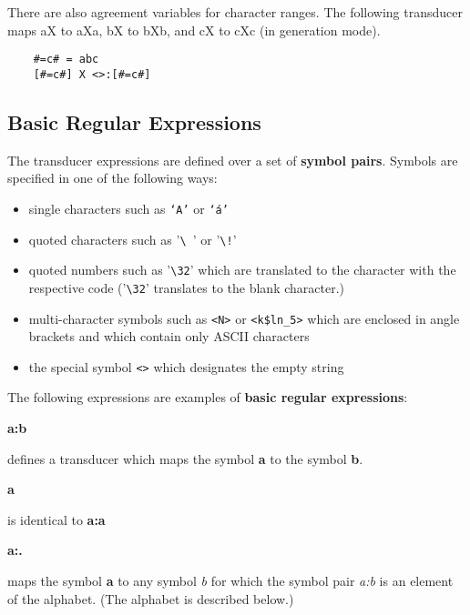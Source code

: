 \documentclass{article}
\begin{document}
There are also agreement variables for character ranges. The following
transducer maps aX to aXa, bX to bXb, and cX to cXc (in generation mode).
\begin{verbatim}
    #=c# = abc
    [#=c#] X <>:[#=c#]
\end{verbatim}


\subsection*{Basic Regular Expressions}

The transducer expressions are defined over a set of \textbf{symbol
  pairs}. Symbols are specified in one of the following ways:

\begin{itemize}
\item single characters such as \texttt{`A'} or \texttt{`{\'a}'}
\item quoted characters such as '\verb#\ #' or '\verb#\!#'
\item quoted numbers such as '\verb#\32#' which are translated to the character
  with the respective code ('\verb#\32#' translates to the blank
  character.)
\item multi-character symbols such as \verb#<N># or \verb#<k$ln_5># which
  are enclosed in angle brackets and which contain only ASCII characters
\item the special symbol \verb#<># which designates the empty string
\end{itemize}

\noindent
The following expressions are examples of \textbf{basic regular
  expressions}:\\

\parbox[t]{2cm}{\textbf{a:b}}
\begin{minipage}[t]{11cm}
  defines a transducer which maps the symbol \textbf{a} to the
  symbol \textbf{b}.\\
\end{minipage}

\parbox[t]{2cm}{\textbf{a}}
\begin{minipage}[t]{12cm}
  is identical to \textbf{a:a}\\
\end{minipage}

\parbox[t]{2cm}{\textbf{a:.}}
\begin{minipage}[t]{12cm}
  maps the symbol \textbf{a} to any symbol \emph{b} for which the
  symbol pair \emph{a:b} is an element of the alphabet.
  (The alphabet is described below.)\\
\end{minipage}
\end{document}
